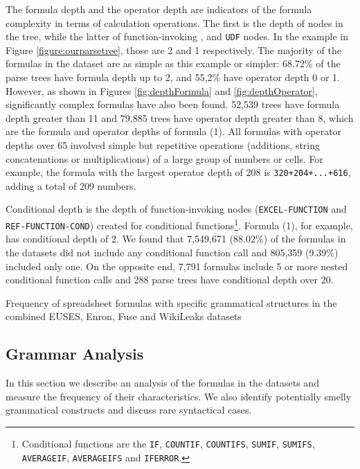 \documentclass[times]{smrauth}
\begin{document}
The formula depth and the operator depth are indicators of the formula complexity in terms of calculation operations. The first is the depth of  nodes in the tree, while the latter of function-invoking  ,  and \texttt{UDF} nodes. In the example in Figure \ref{figure:ourparsetree}, those are 2 and 1 respectively. The majority of the formulas in the dataset are as simple as this example or simpler: 68.72\% of the parse trees have formula depth up to 2, and 55,2\% have operator depth 0 or 1. However, as shown in Figures \ref{fig:depthFormula} and \ref{fig:depthOperator}, significantly complex formulas have also been found. 52,539 trees have formula depth greater than 11 and 79,885 trees have operator depth greater than 8, which are the formula and operator depths of formula (1). All formulas with operator depths over 65 involved simple but repetitive operations (additions, string concatenations or multiplications) of a large group of numbers or cells. For example, the formula with the largest operator depth of 208 is \texttt{320+204+...+616}, adding a total of 209 numbers.

Conditional depth is the depth of function-invoking nodes (\texttt{EXCEL-FUNCTION} and \texttt{REF-FUNCTION-COND}) created for conditional functions\footnote{Conditional functions are the \texttt{IF}, \texttt{COUNTIF}, \texttt{COUNTIFS}, \texttt{SUMIF}, \texttt{SUMIFS}, \texttt{AVERAGEIF}, \texttt{AVERAGEIFS} and \texttt{IFERROR}.}. Formula (1), for example, has conditional depth of 2. We found that 7,549,671 (88.02\%) of the formulas in the datasets did not include any conditional function call and 805,359 (9.39\%) included only one. On the opposite end, 7,791 formulas include 5 or more nested conditional function calls and 288 parse trees have conditional depth over 20.

\begin{table}
	\vspace{2mm}
	\caption{Frequency of spreadsheet formulas with specific grammatical structures in the combined EUSES, Enron, Fuse and WikiLeaks datasets}
	\label{table:occurences}
	\centering
	
\end{table}

\subsection{Grammar Analysis}
\label{subsection:grammarAnalysis}
In this section we describe an analysis of the formulas in the datasets and measure the frequency of their characteristics. We also identify potentially smelly grammatical constructs and discuss rare syntactical cases.
\end{document}
